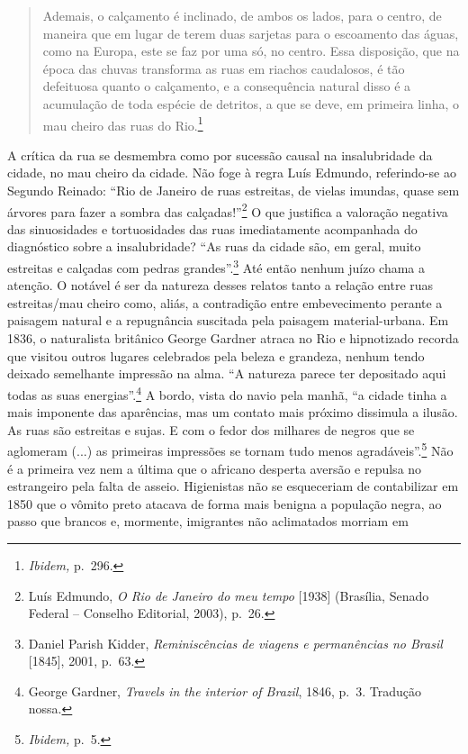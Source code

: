 \begin{quote}
Ademais, o calçamento é inclinado, de ambos os lados, para o centro, de
maneira que em lugar de terem duas sarjetas para o escoamento das águas,
como na Europa, este se faz por uma só, no centro. Essa disposição, que
na época das chuvas transforma as ruas em riachos caudalosos, é tão
defeituosa quanto o calçamento, e a consequência natural disso é a
acumulação de toda espécie de detritos, a que se deve, em primeira
linha, o mau cheiro das ruas do Rio.\footnote{\emph{Ibidem,} p.~296.}
\end{quote}

A crítica da rua se desmembra como por sucessão causal na insalubridade
da cidade, no mau cheiro da cidade. Não foge à regra Luís Edmundo,
referindo-se ao Segundo Reinado: ``Rio de Janeiro de ruas estreitas, de
vielas imundas, quase sem árvores para fazer a sombra das
calçadas!''\footnote{Luís Edmundo, \emph{O Rio de Janeiro do meu tempo}
  {[}1938{]} (Brasília, Senado Federal -- Conselho Editorial, 2003),
  p.~26.} O que justifica a valoração negativa das sinuosidades e
tortuosidades das ruas imediatamente acompanhada do diagnóstico sobre a
insalubridade? ``As ruas da cidade são, em geral, muito estreitas e
calçadas com pedras grandes''.\footnote{Daniel Parish Kidder,
  \emph{Reminiscências de viagens e permanências no Brasil} {[}1845{]},
  2001, p.~63.} Até então nenhum juízo chama a atenção. O notável é ser
da natureza desses relatos tanto a relação entre ruas estreitas/mau
cheiro como, aliás, a contradição entre embevecimento perante a paisagem
natural e a repugnância suscitada pela paisagem material-urbana. Em
1836, o naturalista britânico George Gardner atraca no Rio e hipnotizado
recorda que visitou outros lugares celebrados pela beleza e grandeza,
nenhum tendo deixado semelhante impressão na alma. ``A natureza parece
ter depositado aqui todas as suas energias''.\footnote{George Gardner,
  \emph{Travels in the interior of Brazil}, 1846, p.~3. Tradução nossa.}
A bordo, vista do navio pela manhã, ``a cidade tinha a mais imponente
das aparências, mas um contato mais próximo dissimula a ilusão. As ruas
são estreitas e sujas. E com o fedor dos milhares de negros que se
aglomeram (...) as primeiras impressões se tornam tudo menos
agradáveis''.\footnote{\emph{Ibidem,} p.~5.} Não é a primeira vez nem a
última que o africano desperta aversão e repulsa no estrangeiro pela
falta de asseio. Higienistas não se esqueceriam de contabilizar em 1850
que o vômito preto atacava de forma mais benigna a população negra, ao
passo que brancos e, mormente, imigrantes não aclimatados morriam em
